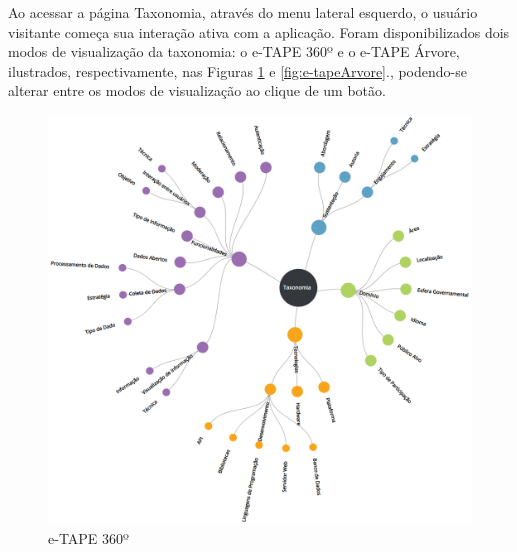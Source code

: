 \par
Ao acessar a página Taxonomia, através do menu lateral esquerdo, o usuário visitante começa sua interação ativa com a aplicação.
Foram disponibilizados dois modos de visualização da taxonomia: o e-TAPE 360º e o e-TAPE Árvore, ilustrados, respectivamente,
nas Figuras \ref{fig:e-tape360} e \ref{fig:e-tapeArvore}., podendo-se alterar entre os modos de visualização ao clique de um botão.

\begin{figure}[!ht]
    \centering
    \includegraphics[scale=0.20]{./figuras/taxonomia-cropped.png}
    \caption{e-TAPE 360º}
    \label{fig:e-tape360}
\end{figure}

